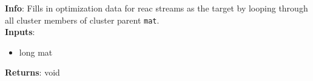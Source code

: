 \textbf{Info}: Fills in optimization data for reac streams as the target by
looping through all cluster members of cluster parent \texttt{mat}.\\

\noindent \textbf{Inputs}:
\begin{itemize}
\item{long mat}
\end{itemize}

\noindent \textbf{Returns}: void
